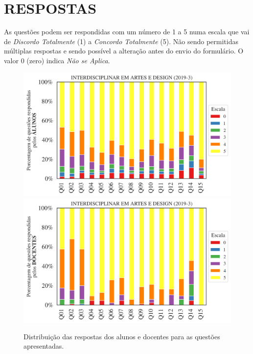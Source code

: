 \documentclass[a4paper,10pt]{article}
\begin{document}
\section{RESPOSTAS}
As questões podem ser respondidas com um número de 1 a 5 numa escala que vai de {\it Discordo Totalmente} (1) a {\it Concordo Totalmente} (5). Não sendo permitidas múltiplas respostas e sendo possível a alteração antes do envio do formulário. O valor 0 (zero) indica {\it Não se Aplica}.


\begin{figure}[h]
\centering
\includegraphics[width=0.999\linewidth]{resposta_alunos_questoes_curso_116500.png}
\includegraphics[width=0.999\linewidth]{resposta_docentes_questoes_curso_116500.png}
\caption{\label{fig:resposta_questoes_curso}Distribuição das respostas dos alunos e docentes para as questões apresentadas. }
\end{figure}
\end{document}
